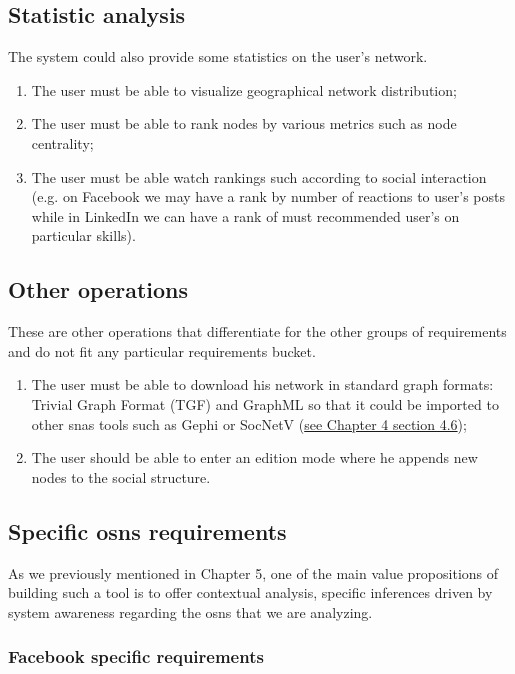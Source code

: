 \subsection{Statistic analysis}

The system could also provide some statistics on the user's network.

\begin{enumerate}
    \item The user must be able to visualize geographical network distribution;
    \item The user must be able to rank nodes by various metrics such as node centrality;
    \item The user must be able watch rankings such according to social interaction (e.g. on Facebook we may have a rank by number of reactions to user's posts while in LinkedIn we can
    have a rank of must recommended user's on particular skills).
\end{enumerate}

\subsection{Other operations}

These are other operations that differentiate for the other groups of requirements and do not fit any particular requirements bucket.

\begin{enumerate}
    \item The user must be able to download his network in standard graph formats: Trivial Graph Format (TGF) and GraphML so that it could
    be imported to other \glspl{sna} tools such as Gephi or SocNetV (\hyperref[sec:snas]{see Chapter 4 section 4.6});
    \item The user should be able to enter an edition mode where he appends new nodes to the social structure.
\end{enumerate}


\subsection{Specific \glspl{osn} requirements}

As we previously mentioned in Chapter 5, one of the main value propositions of building such a tool is to offer contextual analysis, specific inferences driven
by system awareness regarding the \glspl{osn} that we are analyzing.

\subsubsection*{Facebook specific requirements}

